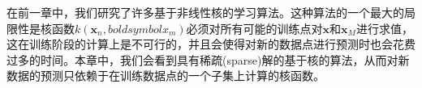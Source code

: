 在前一章中，我们研究了许多基于非线性核的学习算法。这种算法的一个最大的局限性是核函数$k(\boldsymbol{x}_n,boldsymbol{x}_m)$必须对所有可能的训练点对$\boldsymbol{x}$和$\boldsymbol{x}_M$进行求值，这在训练阶段的计算上是不可行的，并且会使得对新的数据点进行预测时也会花费过多的时间。本章中，我们会看到具有稀疏(sparse)解的基于核的算法，从而对新数据的预测只依赖于在训练数据点的一个子集上计算的核函数。